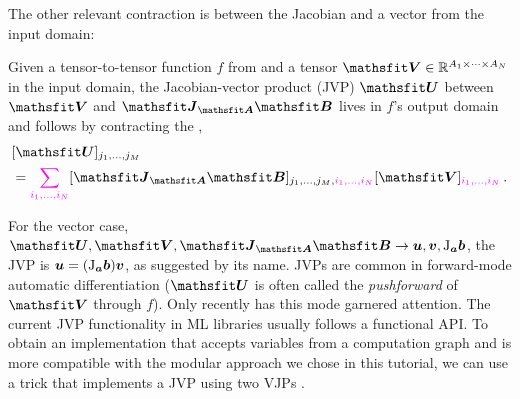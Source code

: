 The other relevant contraction is between the Jacobian and a vector from the input domain:

\begin{definition}\label{def:jvp}
  Given a tensor-to-tensor function $f$ from  and a tensor $\tV \in \sR^{A_1 \times \dots \times A_N}$ in the input domain, the Jacobian-vector product (JVP) $\tU$ between $\tV$ and $\tJ_{\tA}\tB$ lives in $f$'s output domain and follows by contracting the ,
  \begin{align*}
    & [\tU]_{j_1, \dots, j_M}
    \\
    & =
      \colored[VectorPink]{\sum_{i_1, \dots, i_N}}
      [\tJ_{\tA}\tB]_{j_1, \dots, j_M, \colored[VectorPink]{i_1, \dots, i_N}}
      [\tV]_{\colored[VectorPink]{i_1, \dots, i_N}}\,.
  \end{align*}
\end{definition}
For the vector case, $\tU, \tV, \tJ_{\tA}\tB \to \vu, \vv, \jac_{\va}\vb$, the JVP is ${\bm{u}} = (\mathrm{J}_{{\bm{a}}}{\bm{b}}) {\bm{v}}$, as suggested by its name.
JVPs are common in forward-mode automatic differentiation ($\tU$ is often called the \emph{pushforward} of $\tV$ through $f$).
Only recently has this mode garnered attention.
The current JVP functionality in ML libraries usually follows a functional API.
To obtain an implementation that accepts variables from a computation graph and is more compatible with the modular approach we chose in this tutorial, we can use a trick that implements a JVP using two VJPs \cite{townsend2017new}.

